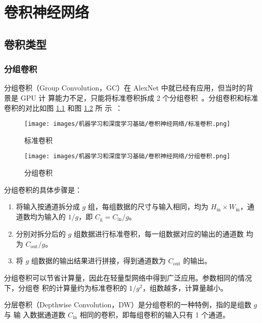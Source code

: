 \chapter{卷积神经网络}

\section{卷积类型}

\subsection{分组卷积}

分组卷积（Group Convolution，GC）在 AlexNet 中就已经有应用，但当时的背景是 GPU 计
算能力不足，只能将标准卷积拆成 2 个分组卷积~。分组卷积和标准
卷积的对比如图 \ref{fig:normal-conv} 和图 \ref{fig:group-conv} 所
示~：

\begin{figure}[ht]
  \centering
  \texttt{[image: images/机器学习和深度学习基础/卷积神经网络/标准卷积.png]}
  \caption{标准卷积}
  \label{fig:normal-conv}
\end{figure}

\begin{figure}[ht]
  \centering
  \texttt{[image: images/机器学习和深度学习基础/卷积神经网络/分组卷积.png]}
  \caption{分组卷积}
  \label{fig:group-conv}
\end{figure}

分组卷积的具体步骤是：

\begin{enumerate}
  \item 将输入按通道拆分成 $g$ 组，每组数据的尺寸与输入相同，均为 $H_{\mathrm{in}}
    \times W_{\mathrm{in}}$，通道数均为输入的 $ 1/g $，即 $
    C_{\mathrm{g}} = C_{\mathrm{in}} / g $。
  \item 分别对拆分后的 $g$ 组数据进行标准卷积，每一组数据对应的输出的通道数
    均为 $ C_{\mathrm{out}}/g $。
  \item 将 $g$ 组数据的输出结果进行拼接，得到通道数为 $C_{\mathrm{out}}$
    的输出。
\end{enumerate}

分组卷积可以节省计算量，因此在轻量型网络中得到广泛应用。参数相同的情况下，分组卷
积的计算量约为标准卷积的 $ 1 / g^2 $，组数越多，计算量越小。

分层卷积（Depthwise Convolution，DW）是分组卷积的一种特例，指的是组数 $g$ 与 输
入数据通道数 $C_{\mathrm{in}}$ 相同的卷积，即每组卷积的输入只有 1 个通道。


